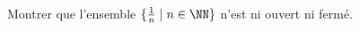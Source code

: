 
\begin{exercice}\label{exo0089}

Montrer que l'ensemble $\{ \frac 1n \mid n \in \NN \}$ n'est ni ouvert ni fermé.
\end{exercice}
